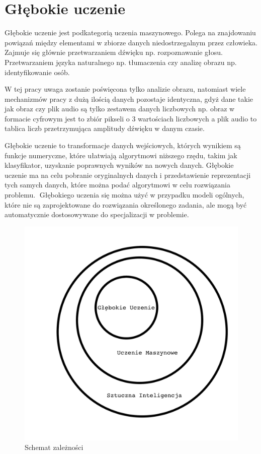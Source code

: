 \documentclass[brudnopis]{xmgr}
\begin{document}
\section{Głębokie uczenie }

Głębokie uczenie jest podkategorią uczenia maszynowego. Polega na znajdowaniu powiązań między elementami w zbiorze danych niedostrzegalnym przez człowieka. Zajmuje się głównie przetwarzaniem dźwięku np. rozpoznawanie głosu. Przetwarzaniem języka naturalnego np. tłumaczenia czy analizę obrazu np. identyfikowanie osób.

W tej pracy uwaga zostanie poświęcona tylko analizie obrazu, natomiast wiele mechanizmów pracy z dużą ilością danych pozostaje identyczna, gdyż dane takie jak obraz czy plik audio są tylko zestawem danych liczbowych np. obraz w formacie cyfrowym jest to zbiór pikseli o 3 wartościach liczbowych a plik audio to tablica liczb przetrzymująca amplitudy dźwięku w danym czasie.

Głębokie uczenie to transformacje danych wejściowych, których wynikiem są funkcje numeryczne, które ułatwiają algorytmowi niższego rzędu, takim jak klasyfikator, uzyskanie poprawnych wyników na nowych danych. Głębokie uczenie ma na celu pobranie oryginalnych danych i przedstawienie reprezentacji tych samych danych, które można podać algorytmowi w celu rozwiązania problemu. 
􏰁Głębokiego uczenia się można użyć w przypadku modeli ogólnych, które nie są zaprojektowane do rozwiązania określonego zadania, ale mogą być automatycznie dostosowywane do specjalizacji w problemie.

\begin{figure}[!tbh]
\centering
\includegraphics[width=.8\hsize]{fig/1}
\caption{Schemat zależności\label{RYS.1}}
\end{figure}
\end{document}
